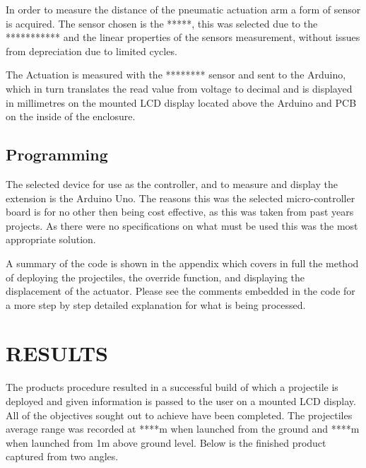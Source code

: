 \documentclass[a4paper, 10pt]{IEEEconf}
\begin{document}
In order to measure the distance of the pneumatic actuation arm a form of sensor is acquired. The sensor chosen is the *****, this was selected due to the *********** and the linear properties of the sensors measurement, without issues from depreciation due to limited cycles.

The Actuation is measured with the ******** sensor and sent to the Arduino, which in turn translates the read value from voltage to decimal and is displayed in millimetres on the mounted LCD display located above the Arduino and PCB on the inside of the enclosure. 



\subsection{Programming}

The selected device for use as the controller, and to measure and display the extension is the Arduino Uno. The reasons this was the selected micro-controller board is for no other then being cost effective, as this was taken from past years projects. As there were no specifications on what must be used this was the most appropriate solution.

A summary of the code is shown in the appendix which covers in full the method of deploying the projectiles, the override function, and displaying the displacement of the actuator. Please see the comments embedded in the code for a more step by step detailed explanation for what is being processed.


\section{RESULTS}

The products procedure resulted in a successful build of which a projectile is deployed and given information is passed to the user on a mounted LCD display. All of the objectives sought out to achieve have been completed. The projectiles average range was recorded at ****m when launched from the ground and ****m when launched from 1m above ground level. Below is the finished product captured from two angles.
\end{document}

